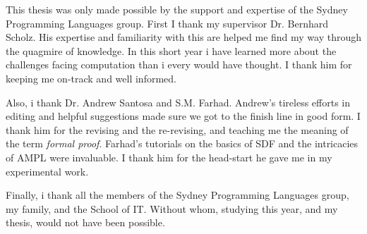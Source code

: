 \begin{acknowledgements}

This thesis was only made possible by the support and expertise of the Sydney Programming Languages group.
First I thank my supervisor Dr. Bernhard Scholz.
His expertise and familiarity with this are helped me find my way through the quagmire of knowledge.
In this short year i have learned more about the challenges facing computation than i every would have thought.
I thank him for keeping me on-track and well informed.

Also, i thank Dr. Andrew Santosa and S.M. Farhad.
Andrew's tireless efforts in editing and helpful suggestions made sure we got to the finish line in good form.
I thank him for the revising and the re-revising, and teaching me the meaning of the term {\em formal proof}.
Farhad's tutorials on the basics of SDF and the intricacies of AMPL were invaluable.
I thank him for the head-start he gave me in my experimental work.

Finally, i thank all the members of the Sydney Programming Languages group, my family, and the School of IT.
Without whom, studying this year, and my thesis, would not have been possible.

\end{acknowledgements}
